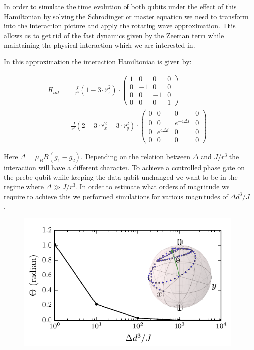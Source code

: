 In order to simulate the time evolution of both qubits under the effect of this Hamiltonian by solving the Schrödinger or master equation we need to transform into the interaction picture and apply the rotating wave approximation. This allows us to get rid of the fast dynamics given by the Zeeman term while maintaining the physical interaction which we are interested in. 

In this approximation the interaction Hamiltonian is given by:

\begin{align*}
	H_{int}&= \frac{J}{r^3} (1-3 \cdot \hat{r}_z^2) \cdot
	\begin{pmatrix}
	1 & 0 & 0 & 0 \\
	0 & -1 & 0 & 0 \\
	0 & 0 & -1 & 0 \\
	0 & 0 & 0 & 1 
	\end{pmatrix} \\
	&+ \frac{J}{r^3} (2-3 \cdot \hat{r}_x^2 -3 \cdot \hat{r}_y^2) \cdot
	\begin{pmatrix}
	0 & 0 & 0 & 0 \\
	0 & 0 & e^{-4 \Delta i} & 0 \\
	0 & e^{4 \Delta i} & 0 & 0 \\
	0 & 0 & 0 & 0 
	\end{pmatrix}
\end{align*}

Here $\Delta=\mu_B B (g_1-g_2)$. Depending on the relation between $\Delta$ and $J/r^3$ the interaction will have a different character. 
To achieve a controlled phase gate on the probe qubit while keeping the data qubit unchanged we want to be in the regime where $\Delta \gg J/r^3$.
In order to estimate what orders of magnitude we require to achieve this we performed simulations for various magnitudes of $\Delta d^3/ J$.

\begin{figure}[H]
	\includegraphics[width=\linewidth]{../Figures/flip-flop}
	\caption{}
	\label{FIG:flip-flop}
\end{figure}

